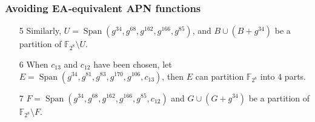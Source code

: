 \documentclass[
    aspectratio=169,                   %
]{beamer}
\newcommand{\F}{\mathbb{F}}
\begin{document}
    \begin{frame}
        \frametitle{Avoiding EA‑equivalent APN functions}
        
        \begin{example}
            \begin{enumerate}
                    \item[5] Similarly, $ U=\operatorname{Span}(g^{34}, g^{68} , g^{162}, g^{166} ,g^{85}) $, 
                    and $ B\cup(B+g^{34}) $ be a partition of $ \F_{2^8}\setminus U $.
                    \item[6] When $ c_{13} $ and $ c_{12} $ have been chosen, 
                    let $ E=\operatorname{Span}(g^{34}, g^{81} , g^{83}, g^{170} ,g^{106},c_{13}) $, then $ E $
                    can partition $ \F_{2^8} $ into $ 4 $ parts.
                    \item[7] $ F=\operatorname{Span}(g^{34}, g^{68} , g^{162}, g^{166} ,g^{85},c_{12}) $ and 
                    $ G\cup (G+g^{34}) $ be a partition of $ \F_{2^8}\setminus F $. 
                \end{enumerate}
            \end{example}
        
        \end{frame}

    
    \makebottom     %
\end{document}
